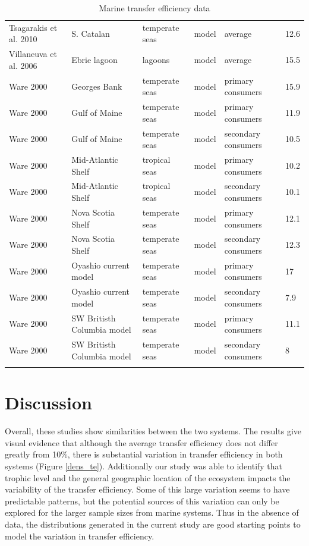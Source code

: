 \documentclass[oneside,12pt,final]{sty/ucthesis-CA2012}
\begin{document}
\begin{mainmatter}
\begin{longtable} {p{3cm}p{3cm}p{1.8cm}lp{2cm}p{1.7cm}}
    Tsagarakis et al. 2010   & S. Catalan & temperate seas & model & average & 12.6 \\
    Villaneuva et al. 2006  & Ebrie lagoon  & lagoons & model & average & 15.5 \\
    Ware 2000  & Georges Bank & temperate seas & model & primary consumers & 15.9 \\
    Ware 2000   & Gulf of Maine & temperate seas & model & primary consumers & 11.9 \\
    Ware 2000  & Gulf of Maine & temperate seas & model & secondary consumers & 10.5 \\
    Ware 2000  & Mid-Atlantic Shelf & tropical seas & model & primary consumers & 10.2 \\
    Ware 2000   & Mid-Atlantic Shelf & tropical seas & model & secondary consumers & 10.1 \\
    Ware 2000   & Nova Scotia Shelf & temperate seas & model & primary consumers & 12.1 \\
    Ware 2000   & Nova Scotia Shelf & temperate seas & model & secondary consumers & 12.3 \\
    Ware 2000   & Oyashio current model & temperate seas & model & primary consumers & 17 \\
    Ware 2000   & Oyashio current model & temperate seas & model & secondary consumers & 7.9 \\
    Ware 2000   & SW Britisth Columbia model & temperate seas & model & primary consumers & 11.1 \\
    Ware 2000   & SW Britisth Columbia model & temperate seas & model & secondary consumers & 8 \\
    \bottomrule
    \caption{Marine transfer efficiency data}
    \label{datamar}
    \end{longtable}
\normalsize


\section{Discussion}
Overall, these studies show similarities between the two systems. The results give visual evidence that although the average transfer efficiency does not differ greatly from 10\%, there is substantial variation in transfer efficiency in both systems (Figure \ref{dens_te}). Additionally our study was able to identify that trophic level and the general geographic location of the ecosystem impacts the variability of the transfer efficiency. Some of this large variation seems to have predictable patterns, but the potential sources of this variation can only be explored for the larger sample sizes from marine systems. Thus in the absence of data, the distributions generated in the current study are good starting points to model the variation in transfer efficiency. 


\end{mainmatter}
\end{document}
